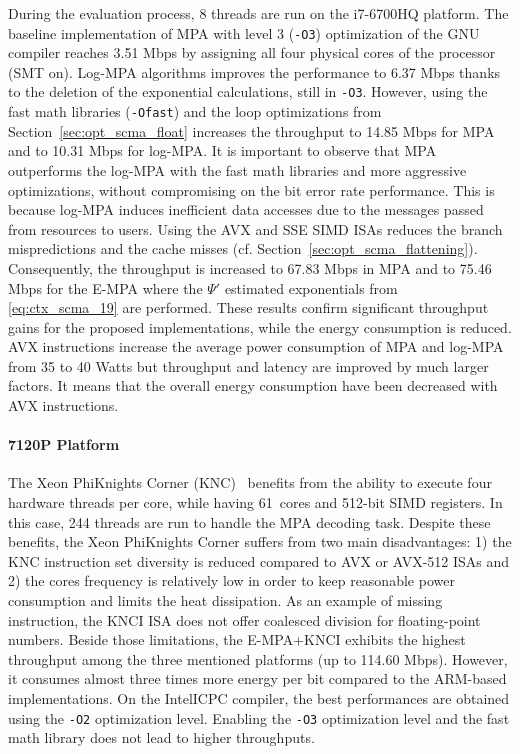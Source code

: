 During the evaluation process, 8 threads are run on the i7-6700HQ platform. The
baseline implementation of MPA with level 3 (\verb|-O3|) optimization of the GNU
compiler reaches 3.51 Mbps by assigning all four physical cores of the processor
(SMT on). Log-MPA algorithms improves the performance to 6.37 Mbps thanks to the
deletion  of the exponential calculations, still in \verb|-O3|. However, using
the fast math libraries (\verb|-Ofast|) and the loop optimizations from
Section~\ref{sec:opt_scma_float} increases the throughput to 14.85 Mbps for MPA
and to 10.31 Mbps for log-MPA. It is important to observe that MPA outperforms
the log-MPA with the fast math libraries and more aggressive optimizations,
without compromising on the bit error rate performance. This is because log-MPA
induces inefficient data accesses due to the messages passed from resources to
users. Using the AVX and SSE SIMD ISAs reduces the branch mispredictions and the
cache misses (cf. Section~\ref{sec:opt_scma_flattening}). Consequently, the
throughput is increased to 67.83 Mbps in MPA and to 75.46 Mbps for the E-MPA
where the $\Psi'$ estimated exponentials from \eqref{eq:ctx_scma_19} are
performed. These results confirm significant throughput gains for the proposed
implementations, while the energy consumption is reduced. AVX instructions
increase the average power consumption of MPA and log-MPA from 35 to 40 Watts
but throughput and latency are improved by much larger factors. It means that
the overall energy consumption have been decreased with AVX instructions.

\paragraph{7120P Platform}

The Xeon Phi\TM Knights Corner (KNC)~\cite{Chrysos2012} benefits from the
ability to execute four hardware threads per core, while having 61~cores and
512-bit SIMD registers. In this case, 244 threads are run to handle the MPA
decoding task. Despite these benefits, the Xeon Phi\TM Knights Corner suffers
from two main disadvantages: 1) the KNC instruction set diversity is reduced
compared to AVX or AVX-512 ISAs and 2) the cores frequency is relatively low in
order to keep reasonable power consumption and limits the heat dissipation. As
an example of missing instruction, the KNCI ISA does not offer coalesced
division for floating-point numbers. Beside those limitations, the E-MPA+KNCI
exhibits the highest throughput among the three mentioned platforms (up to
114.60 Mbps). However, it consumes almost three times more energy per bit
compared to the ARM\R-based implementations. On the Intel\R ICPC compiler, the
best performances are obtained using the \verb|-O2| optimization level. Enabling
the \verb|-O3| optimization level and the fast math library does not lead to
higher throughputs.

